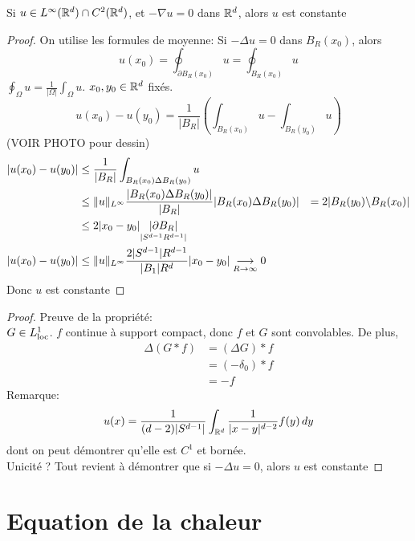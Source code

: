 \documentclass[]{report}
\begin{document}
    \begin{tm}{}{}
        Si $u\in L^{\infty}(\mathbb{R}^d)\cap C^2(\mathbb{R}^d)$, et $-\nabla u=0$ dans $\mathbb{R}^d$, alors $u$ est constante
    \end{tm}

    \begin{proof}
        On utilise les formules de moyenne: Si $-\Delta u=0$ dans $B_R(x_0)$, alors
        \[u(x_0)=\oint_{\partial B_R(x_0)}u=\oint_{B_R(x_0)}u\]
        $\oint_\Omega u=\frac{1}{|\Omega|}\int_\Omega u$. $x_0,y_0\in \mathbb{R}^d$ fixés.\\
        \[u(x_0)-u(y_0)=\frac{1}{|B_R|}\left(\int_{B_R(x_0)}u-\int_{B_R(y_0)}u\right)\]
        (VOIR PHOTO pour dessin)\\
        \begin{align*}
            \left|u(x_0)-u(y_0)\right|&\le \frac{1}{|B_R|}\int_{B_R(x_0)\Delta B_R(y_0)}u\\
            &\le \lVert u \rVert_{L^\infty}\frac{|B_R(x_0)\Delta B_R(y_0)|}{|B_R|}
            |B_R(x_0)\Delta B_R(y_0)|&=2|B_R(y_0)\backslash B_R(x_0)|\\
            &\le 2 |x_0-y_0|\underset{|S^{d-1}R^{d-1}|}{|\partial B_R|}\\
            |u(x_0)-u(y_0)|&\le \lVert u \rVert_{L^\infty}\frac{2|S^{d-1}|R^{d-1}}{|B_1|R^d}|x_0-y_0|\underset{R\to \infty}{\longrightarrow}0
        \end{align*}
        Donc $u$ est constante
    \end{proof}

    \begin{proof}
        Preuve de la propriété:\\
        $G\in L^1_{\text{loc}}$. $f$ continue à support compact, donc $f$ et $G$ sont convolables. De plus,
        \begin{align*}
            \Delta(G*f)&=(\Delta G)*f\\
            &=(-\delta_0)*f\\
            &=-f
        \end{align*}
        Remarque:
        \[u(x)=\frac{1}{(d-2)|S^{d-1}|}\int_{\mathbb{R}^d}\frac{1}{|x-y|^{d-2}}f(y)\, dy\]
        dont on peut démontrer qu'elle est $C^1$ et bornée.\\
        Unicité ? Tout revient à démontrer que si $-\Delta u=0$, alors $u$ est constante
    \end{proof}

    \section{Equation de la chaleur}
\end{document}
